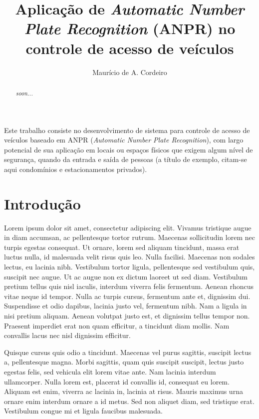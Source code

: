 \documentclass[12pt]{article}
\title{Aplicação de \textit{Automatic Number Plate Recognition} (ANPR) no controle de acesso de veículos}
\author{Maurício de A. Cordeiro\inst{1} }
\begin{document}
 

\maketitle

\begin{abstract}
  \textit{soon...}
\end{abstract}
     
\begin{resumo} 
 Este trabalho consiste no desenvolvimento de sistema para controle de acesso de veículos baseado em ANPR (\textit{Automatic Number Plate Recognition}), com largo potencial de sua aplicação em locais ou espaços físicos que exigem algum nível de segurança, quando da entrada e saída de pessoas (a título de exemplo, citam-se aqui condomínios e estacionamentos privados). 
\end{resumo}

\section{Introdução}

Lorem ipsum dolor sit amet, consectetur adipiscing elit. Vivamus tristique augue in diam accumsan, ac pellentesque tortor rutrum. Maecenas sollicitudin lorem nec turpis egestas consequat. Ut ornare, lorem sed aliquam tincidunt, massa erat luctus nulla, id malesuada velit risus quis leo. Nulla facilisi. Maecenas non sodales lectus, eu lacinia nibh. Vestibulum tortor ligula, pellentesque sed vestibulum quis, suscipit nec augue. Ut ac augue non ex dictum laoreet ut sed diam. Vestibulum pretium tellus quis nisl iaculis, interdum viverra felis fermentum. Aenean rhoncus vitae neque id tempor. Nulla ac turpis cursus, fermentum ante et, dignissim dui. Suspendisse et odio dapibus, lacinia justo vel, fermentum nibh. Nam a ligula in nisi pretium aliquam. Aenean volutpat justo est, et dignissim tellus tempor non. Praesent imperdiet erat non quam efficitur, a tincidunt diam mollis. Nam convallis lacus nec nisl dignissim efficitur.

Quisque cursus quis odio a tincidunt. Maecenas vel purus sagittis, suscipit lectus a, pellentesque magna. Morbi sagittis, quam quis suscipit suscipit, lectus justo egestas felis, sed vehicula elit lorem vitae ante. Nam lacinia interdum ullamcorper. Nulla lorem est, placerat id convallis id, consequat eu lorem. Aliquam est enim, viverra ac lacinia in, lacinia at risus. Mauris maximus urna ornare enim interdum ornare a id metus. Sed non aliquet diam, sed tristique erat. Vestibulum congue mi et ligula faucibus malesuada.
\end{document}
